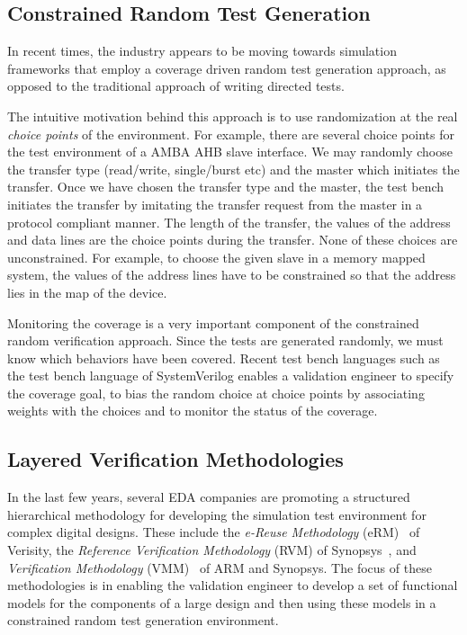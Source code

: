 \subsection{Constrained Random Test Generation}
\noindent
In recent times, 
the industry appears to be moving towards simulation frameworks that employ
a coverage driven random test generation approach, as opposed to the
traditional approach of writing directed tests. 

\noindent
The intuitive motivation behind this approach is 
to use randomization at the real {\em choice points}
of the environment. For example, there are several choice points for the
test environment of a AMBA AHB slave interface. We may randomly choose the
transfer type (read/write, single/burst etc) and the master which initiates
the transfer. Once we have chosen the transfer type and the
master, the test bench initiates the transfer by imitating the transfer
request from the master in a protocol compliant manner. The length of the
transfer, the values of the address and data lines are the choice points
during the transfer. None of these choices are unconstrained. For example,
to choose the given slave in a memory mapped system, the values of the
address lines have to be constrained so that the address lies in the map
of the device.

\noindent
Monitoring the coverage is a very important component of the constrained
random verification approach. Since the tests are generated randomly, we
must know which behaviors have been covered. Recent test bench languages
such as the test bench language of SystemVerilog enables a validation
engineer to specify the coverage goal, to bias the random 
choice at choice points by associating weights with the choices and 
to monitor the status of the coverage.

\subsection{Layered Verification Methodologies} \label{layered}
In the last few years, several EDA companies are promoting a structured
hierarchical methodology for developing the simulation test environment
for complex digital designs. These include the {\em e-Reuse Methodology} 
(eRM)~\cite{erm} of Verisity, the {\em Reference Verification 
Methodology} (RVM) of Synopsys~\cite{rvm},
and {\em Verification Methodology} (VMM)~\cite{bergeron:05} of ARM and Synopsys.
The focus of these methodologies is in enabling the validation engineer to
develop a set of functional models for the components of a large design
and then using these models in a constrained random test generation
environment. 

